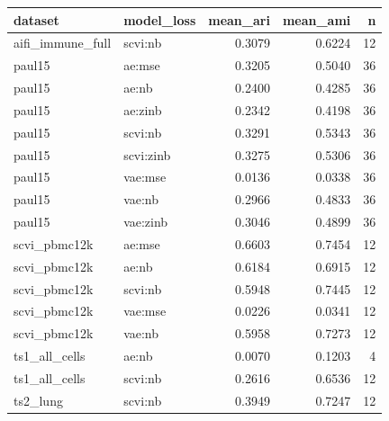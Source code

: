 \begin{tabular}{llrrr}
\toprule
dataset & model\_loss & mean\_ari & mean\_ami & n \\
\midrule
aifi\_immune\_full & scvi:nb & 0.3079 & 0.6224 & 12 \\
paul15 & ae:mse & 0.3205 & 0.5040 & 36 \\
paul15 & ae:nb & 0.2400 & 0.4285 & 36 \\
paul15 & ae:zinb & 0.2342 & 0.4198 & 36 \\
paul15 & scvi:nb & 0.3291 & 0.5343 & 36 \\
paul15 & scvi:zinb & 0.3275 & 0.5306 & 36 \\
paul15 & vae:mse & 0.0136 & 0.0338 & 36 \\
paul15 & vae:nb & 0.2966 & 0.4833 & 36 \\
paul15 & vae:zinb & 0.3046 & 0.4899 & 36 \\
scvi\_pbmc12k & ae:mse & 0.6603 & 0.7454 & 12 \\
scvi\_pbmc12k & ae:nb & 0.6184 & 0.6915 & 12 \\
scvi\_pbmc12k & scvi:nb & 0.5948 & 0.7445 & 12 \\
scvi\_pbmc12k & vae:mse & 0.0226 & 0.0341 & 12 \\
scvi\_pbmc12k & vae:nb & 0.5958 & 0.7273 & 12 \\
ts1\_all\_cells & ae:nb & 0.0070 & 0.1203 & 4 \\
ts1\_all\_cells & scvi:nb & 0.2616 & 0.6536 & 12 \\
ts2\_lung & scvi:nb & 0.3949 & 0.7247 & 12 \\
\bottomrule
\end{tabular}
